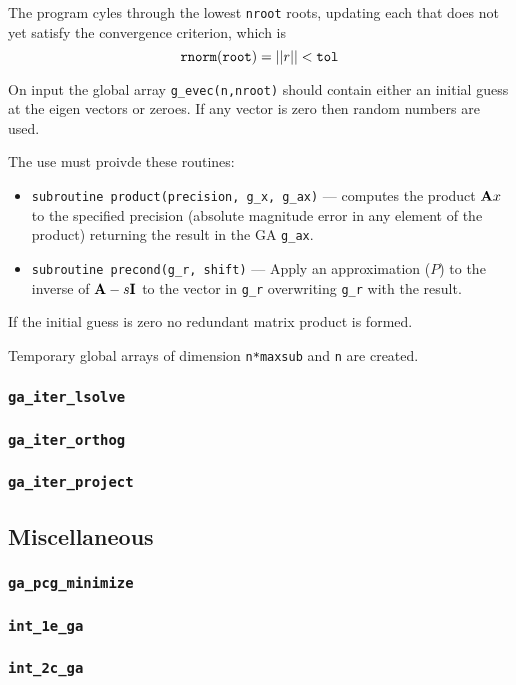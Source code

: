   The program cyles through the lowest \verb+nroot+ roots, updating each that
does not yet satisfy the convergence criterion, which is
\begin{displaymath}
   {\tt rnorm(root)} = ||r|| < {\tt tol}
\end{displaymath}

 On input the global array \verb+g_evec(n,nroot)+ should contain either an
initial guess at the eigen vectors or zeroes.  If any vector is zero
then random numbers are used.

The use must proivde these routines:
\begin{itemize}
\item \verb+subroutine product(precision, g_x, g_ax)+ ---
     computes the product ${\bf A}x$ to the specified precision (absolute
     magnitude error in any element of the product) returning the result
     in the GA \verb+g_ax+.
\item \verb+subroutine precond(g_r, shift)+ ---
     Apply an approximation ($P$) to the inverse of ${\bf A} - s {\bf
     I}$ to the vector in \verb+g_r+ overwriting \verb+g_r+ with the result.
\end{itemize}
     
If the initial guess is zero no redundant matrix product is formed.
    
Temporary global arrays of dimension \verb+n*maxsub+
 and \verb+n+ are created.


\subsubsection{{\tt ga\_iter\_lsolve}}

\subsubsection{{\tt ga\_iter\_orthog}}

\subsubsection{{\tt ga\_iter\_project}}

\subsection{Miscellaneous}

\subsubsection{{\tt ga\_pcg\_minimize}}

\subsubsection{{\tt int\_1e\_ga}}

\subsubsection{{\tt int\_2c\_ga}}


